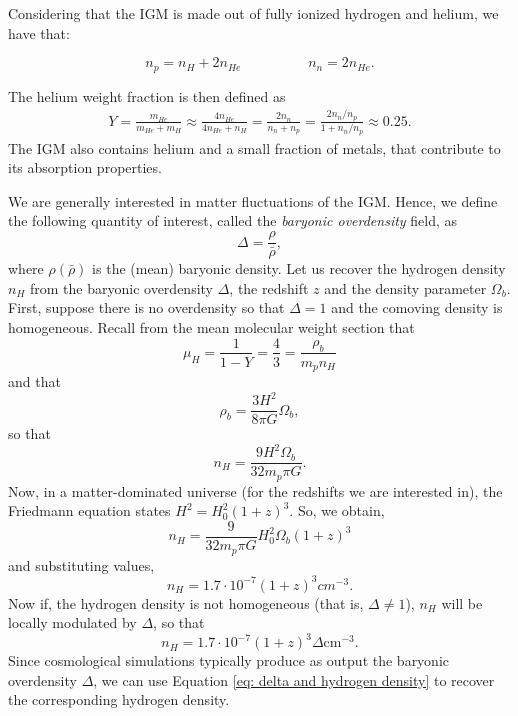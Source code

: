 Considering that the IGM is made out of fully ionized hydrogen and helium, we have that:

\begin{equation}
    n_p=n_H+2n_{He} \hspace{2cm} n_n=2n_{He}.
\end{equation}

The helium weight fraction is then defined as
\begin{eqnarray}
    Y=\frac{m_{He}}{m_{He}+m_H}\approx \frac{4n_{He}}{4n_{He}+n_H}=\frac{2n_n}{n_n+n_p}=\frac{2 n_n/n_p}{1+n_n/n_p}\approx 0.25 .
\end{eqnarray}
The IGM also contains helium and a small fraction of metals, that contribute to its absorption properties.

We are generally interested in matter fluctuations of the IGM. Hence, we define the following quantity of interest, called the \emph{baryonic overdensity} field, as 
\begin{equation}
    \Delta =\frac{\rho}{\bar{\rho}},
\end{equation}
where $\rho(\bar{\rho})$ is the (mean) baryonic density. Let us recover the hydrogen density $n_H$ from the baryonic overdensity $\Delta$, the redshift $z$ and the density parameter $\Omega_b$.
First, suppose there is no overdensity so that $\Delta=1$ and the comoving density is homogeneous. Recall from the mean molecular weight section that
\begin{equation}
    \mu_H=\frac{1}{1-Y}=\frac{4}{3}=\frac{\rho_b}{m_pn_H}
\end{equation}
and that
\begin{equation}
    \rho_b=\frac{3H^2}{8\pi G}\Omega_b,
\end{equation}
so that
\begin{equation}
    n_H=\frac{9H^2 \Omega_b}{32m_p\pi G}.
\end{equation}
Now, in a matter-dominated universe (for the redshifts we are interested in), the Friedmann equation states $H^2=H_0^2(1+z)^3$.
So, we obtain,
\begin{equation}
    n_H=\frac{9}{32m_p\pi G}H_0^2\Omega_b (1+z)^3
\end{equation}
and substituting values,
\begin{equation}
    n_H=1.7\cdot 10^{-7}(1+z)^3 cm^{-3}.
\end{equation}
Now if, the hydrogen density is not homogeneous (that is, $\Delta \neq 1$), $n_H$ will be locally modulated by $\Delta$, so that
\begin{equation}\label{eq: delta and hydrogen density}
    n_H=1.7\cdot 10^{-7}(1+z)^3 \Delta \mathrm{cm}^{-3} .
\end{equation}
Since cosmological simulations typically produce as output the baryonic overdensity $\Delta$, we can use Equation \ref{eq: delta and hydrogen density} to recover the corresponding hydrogen density.

